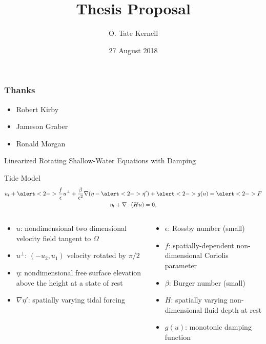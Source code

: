 \documentclass[presentation]{beamer}
\date{27 August 2018}
\author{O. Tate Kernell\inst{1}}
\institute{
\inst{1}Department of Mathematics, Baylor University
}
\title[MFEM for waves]{Thesis Proposal}
\begin{document}
\maketitle

\begin{frame}
  \frametitle{Thanks}
  \begin{itemize}
  	\item Robert Kirby
  	\item Jameson Graber
  	\item Ronald Morgan
  \end{itemize}
\end{frame}


\begin{frame}{Linearized Rotating Shallow-Water Equations with Damping}
	\begin{block}{Tide Model}
	\begin{gather*}
	u_t + \alert<2->{\frac{f}{\epsilon}u^{\perp}} + \frac{\beta}{\epsilon^2}\nabla(\eta - \alert<2->{\eta'}) + \alert<2->{g(u)} = \alert<2->{F}\\
	\eta_t + \nabla \cdot (Hu) = 0,
	\end{gather*}
		\begin{columns}
			\begin{column}{0.4\textwidth}
				{\scriptsize
					\begin{itemize}
						\item $u$: nondimensional two dimensional velocity field tangent to $\Omega$
						\item $u^{\perp}$: $(-u_2,u_1)$ velocity rotated by $\pi/2$
						\item $\eta$: nondimensional free surface elevation above the height at a state of rest
						\item $\nabla \eta'$: spatially varying tidal forcing
					\end{itemize}
				}
			\end{column}
			\begin{column}{0.4\textwidth}
				{\scriptsize
					\begin{itemize}
						\item $\epsilon$: Rossby number (small)
						\item $f$: spatially-dependent non-dimensional Coriolis parameter
						\item $\beta$: Burger number (small)
						\item $H$: spatially varying non-dimensional fluid depth at rest
						\item $g(u)$: monotonic damping function
					\end{itemize}
				}
			\end{column}
		\end{columns}
	\end{block}
\end{frame}
\end{document}
